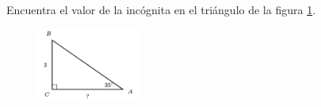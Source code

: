Encuentra el valor de la incógnita en el triángulo de la figura \ref{fig:lados_functrig_27}.
\begin{figure}[H]
    \begin{center}
        \includegraphics[width=0.3\textwidth]{../images/lados_functrig_27.png}
    \end{center}
    \caption{}
    \label{fig:lados_functrig_27}
\end{figure}